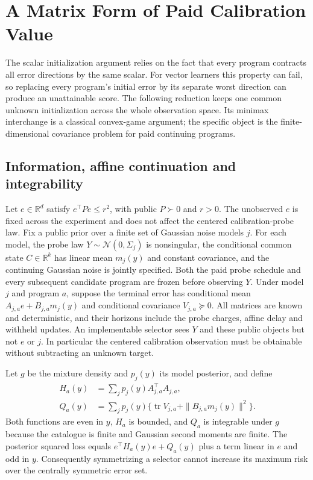 \section{A Matrix Form of Paid Calibration Value}
The scalar initialization argument relies on the fact that every program contracts all error directions by the same scalar.
For vector learners this property can fail, so replacing every program's initial error by its separate worst direction can produce an unattainable score.
The following reduction keeps one common unknown initialization across the whole observation space.
Its minimax interchange is a classical convex-game argument; the specific object is the finite-dimensional covariance problem for paid continuing programs.

\subsection{Information, affine continuation and integrability}
Let $e\in\mathbb R^d$ satisfy $e^\top P e\le r^2$, with public $P\succ0$ and $r>0$.
The unobserved $e$ is fixed across the experiment and does not affect the centered calibration-probe law.
Fix a public prior over a finite set of Gaussian noise models $j$.
For each model, the probe law $Y\sim\mathcal N(0,\Sigma_j)$ is nonsingular, the conditional common state $C\in\mathbb R^k$ has linear mean $m_j(y)$ and constant covariance, and the continuing Gaussian noise is jointly specified.
Both the paid probe schedule and every subsequent candidate program are frozen before observing $Y$.
Under model $j$ and program $a$, suppose the terminal error has conditional mean $A_{j,a}e+B_{j,a}m_j(y)$ and conditional covariance $V_{j,a}\succeq0$.
All matrices are known and deterministic, and their horizons include the probe charges, affine delay and withheld updates.
An implementable selector sees $Y$ and these public objects but not $e$ or $j$.
In particular the centered calibration observation must be obtainable without subtracting an unknown target.

Let $g$ be the mixture density and $p_j(y)$ its model posterior, and define
\begin{align*}
H_a(y)&=\sum_jp_j(y)A_{j,a}^\top A_{j,a},\\
Q_a(y)&=\sum_jp_j(y)\{\operatorname{tr}V_{j,a}+\|B_{j,a}m_j(y)\|^2\}.
\end{align*}
Both functions are even in $y$, $H_a$ is bounded, and $Q_a$ is integrable under $g$ because the catalogue is finite and Gaussian second moments are finite.
The posterior squared loss equals $e^\top H_a(y)e+Q_a(y)$ plus a term linear in $e$ and odd in $y$.
Consequently symmetrizing a selector cannot increase its maximum risk over the centrally symmetric error set.

